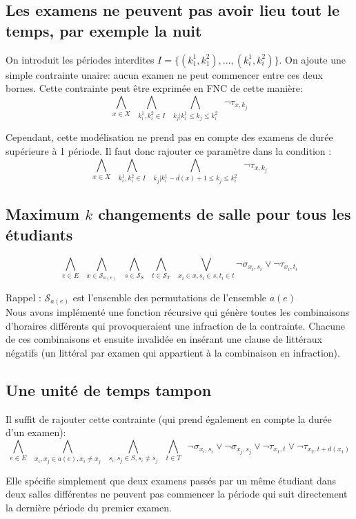 \documentclass[a4paper]{article}
\begin{document}
\subsection{Les examens ne peuvent pas avoir lieu tout le temps, par exemple la nuit}
On introduit les périodes interdites $I = \{(k_1^1, k_1^2), ..., (k_{i}^{1},k_{i}^{2})\}$.
On ajoute une simple contrainte unaire: aucun examen ne peut commencer entre ces deux bornes. Cette contrainte peut être exprimée en FNC de cette manière:
$$ \bigwedge\limits_{x \in X} \,\,\,
  \bigwedge\limits_{k_i^1, k_i^2 \in I}\,\,\,
  \bigwedge\limits_{k_j | k_i^1 \leq k_j \leq k_i^2} \,\,\,
  \lnot \tau_{x,k_j}$$

Cependant, cette modélisation ne prend pas en compte des examens de durée supérieure à 1 période. Il faut donc rajouter ce paramètre dans la condition :
$$ \bigwedge\limits_{x \in X} \,\,\,
  \bigwedge\limits_{k_i^1, k_i^2 \in I}\,\,\,
  \bigwedge\limits_{k_j | k_i^1-d(x)+1 \leq k_j \leq k_i^2} \,\,\,
  \lnot \tau_{x,k_j}$$

\subsection{Maximum $k$ changements de salle pour tous les étudiants}

  $$  \bigwedge\limits_{e \in E} \,\,\,
      \bigwedge\limits_{x \in \mathcal{S}_{a(e)}} \,\,\,
      \bigwedge\limits_{s \in \mathcal{S}_{S}} \,\,\,
      \bigwedge\limits_{t \in \mathcal{S}_{T}} \,\,\,
      \bigvee\limits_{x_i \in x, s_i \in s, t_i \in t} \lnot \sigma_{x_i, s_i} \lor \lnot \tau_{x_i, t_i} $$

  Rappel : $\mathcal{S}_{a(e)}$ est l'ensemble des permutations de l'ensemble $a(e)$\\

  Nous avons implémenté une fonction récursive qui génère toutes les combinaisons d'horaires différents qui provoqueraient une infraction de la contrainte. Chacune de ces combinaisons et ensuite invalidée en insérant une clause de littéraux négatifs (un littéral par examen qui appartient à la combinaison en infraction).

\subsection{Une unité de temps tampon}
  Il suffit de rajouter cette contrainte (qui prend également en compte la durée d'un examen):
  $$  \bigwedge\limits_{e \in E} \,\,\,
      \bigwedge\limits_{x_i, x_j \in a(e), x_i \neq x_j} \,\,\,
      \bigwedge\limits_{s_i, s_j \in S, s_i \neq s_j} \,\,\,
      \bigwedge\limits_{t \in T} \,\,\,
      \lnot \sigma_{x_i, s_i} \lor \lnot \sigma_{x_j, s_j}
      \lor \lnot \tau_{x_1, t} \lor \lnot \tau_{x_2, t+d(x_1)} $$

  Elle spécifie simplement que deux examens passés par un même étudiant dans deux salles différentes ne peuvent pas commencer la période qui suit directement la dernière période du premier examen.
\end{document}
